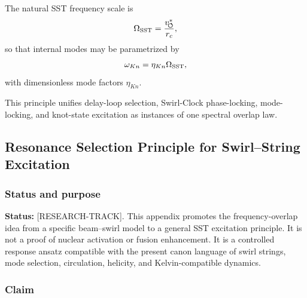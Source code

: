     The natural SST frequency scale is
    \begin{equation}
        \Omega_{\rm SST}
        =
        \frac{v_{\!\boldsymbol{\circlearrowleft}}^{\ast}}{r_c},
    \end{equation}
    so that internal modes may be parametrized by
    \begin{equation}
        \omega_{Kn}
        =
        \eta_{Kn}\Omega_{\rm SST},
    \end{equation}
    with dimensionless mode factors \(\eta_{Kn}\).
    
    This principle unifies delay-loop selection, Swirl-Clock phase-locking,
    mode-locking, and knot-state excitation as instances of one spectral
    overlap law.
    
    
\subsection{Resonance Selection Principle for Swirl--String Excitation}
    \label{app:resonance-selection-principle}
    
    \subsubsection*{Status and purpose}
        
        \noindent
        \textbf{Status:} [RESEARCH-TRACK].
        This appendix promotes the frequency-overlap idea from a specific beam--swirl model to a general SST excitation principle. It is not a proof of nuclear activation or fusion enhancement. It is a controlled response ansatz compatible with the present canon language of swirl strings, mode selection, circulation, helicity, and Kelvin-compatible dynamics.
    
    \subsubsection*{Claim}
        
